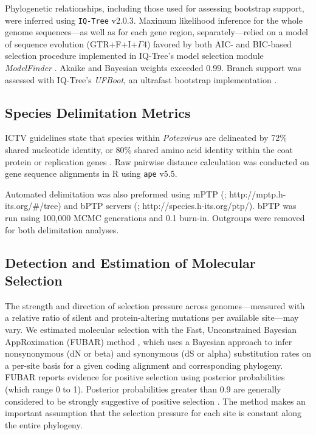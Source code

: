 \documentclass[fleqn,10pt,lineno]{wlpeerj}
\begin{document}
Phylogenetic relationships, including those used for assessing bootstrap support, were inferred using \texttt{IQ-Tree} v2.0.3. 
Maximum likelihood inference for the whole genome sequences---as well as for each gene region, separately---relied on a model of sequence evolution (GTR+F+I+$\Gamma$4) favored by both AIC- and BIC-based selection procedure implemented in IQ-Tree's model selection module {\em ModelFinder} \citep{kalyaanamoorthy2017}. 
Akaike and Bayesian weights exceeded 0.99. 
Branch support was assessed with IQ-Tree's {\em UFBoot}, an ultrafast bootstrap implementation \citep{hoang2018}.


\subsection*{Species Delimitation Metrics}
ICTV guidelines state that species within \textit{Potexvirus} are delineated by 72\% shared nucleotide identity, or 80\% shared amino acid identity within the coat protein or replication genes \citep{ICTV_potexviruses}.
Raw pairwise distance calculation was conducted on gene sequence alignments in R using \texttt{ape} v5.5.

Automated delimitation was also preformed using mPTP (\citealt{Kapli_2017}; http://mptp.h-its.org/\#/tree) and bPTP servers (\citealt{Zhang_2013}; http://species.h-its.org/ptp/). 
bPTP was run using 100,000 MCMC generations and 0.1 burn-in. 
Outgroups were removed for both delimitation analyses.


\subsection*{Detection and Estimation of Molecular Selection}

The strength and direction of selection pressure across genomes---measured with a relative ratio of silent and protein-altering mutations per available site---may vary. 
We estimated molecular selection with the Fast, Unconstrained Bayesian AppRoximation (FUBAR) method \citep{murrell2013}, which uses a Bayesian approach to infer nonsynonymous (dN or beta) and synonymous (dS or alpha) substitution rates on a per-site basis for a given coding alignment and corresponding phylogeny. 
FUBAR reports evidence for positive selection using posterior probabilities (which range 0 to 1).
Posterior probabilities greater than 0.9 are generally considered to be strongly suggestive of positive selection \citep{murrell2013}.
The method makes an important assumption that the selection pressure for each site is constant along the entire phylogeny.
\end{document}
